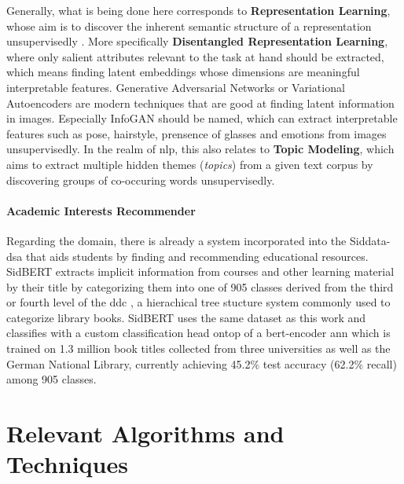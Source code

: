 Generally, what is being done here corresponds to \textbf{Representation Learning}, whose aim is to discover the inherent semantic structure of a representation unsupervisedly \cite{Dayan1995}. More specifically \textbf{Disentangled Representation Learning}, where only salient attributes relevant to the task at hand should be extracted, which means finding latent embeddings whose dimensions are meaningful interpretable features. Generative Adversarial Networks \cite{Goodfellow2014} or Variational Autoencoders \cite{Kingma2013} are modern techniques that are good at finding latent information in images. Especially InfoGAN \cite{Chen2016} should be named, which can extract interpretable features such as pose, hairstyle, prensence of glasses and emotions from images unsupervisedly. In the realm of \gls{nlp}, this also relates to \textbf{Topic Modeling}, which aims to extract multiple hidden themes (\textit{topics}) from a given text corpus by discovering groups of co-occuring words unsupervisedly.

\paragraph{Academic Interests Recommender}

Regarding the domain, there is already a system incorporated into the Siddata-\gls{dsa} that aids students by finding and recommending educational resources. SidBERT \cite{Schrumpf2021DELPHI} extracts implicit information from courses and other learning material by their title by categorizing them into one of 905 classes derived from the third or fourth level of the \gls{ddc} \cite{Dewey1876}, a hierachical tree stucture system commonly used to categorize library books. SidBERT uses the same dataset as this work and classifies with a custom classification head ontop of a \gls{bert}-encoder \gls{ann} which is trained on 1.3 million book titles collected from three universities as well as the German National Library, currently achieving 45.2\% test accuracy (62.2\% recall) among 905 classes.



\section{Relevant Algorithms and Techniques}
\label{sec:required_algos}




